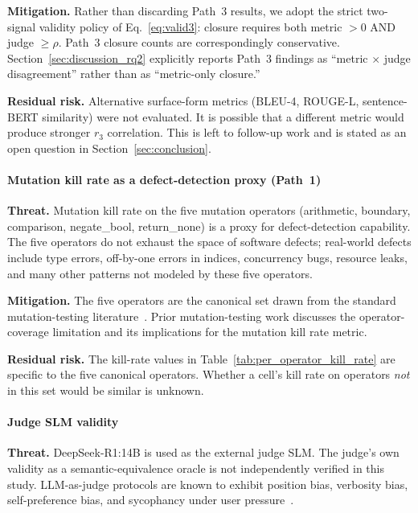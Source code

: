 \textbf{Mitigation.} Rather than discarding Path~3 results, we adopt the strict two-signal validity policy of Eq.~\ref{eq:valid3}: closure requires both metric $> 0$ AND judge $\geq \rho$. Path~3 closure counts are correspondingly conservative. Section~\ref{sec:discussion_rq2} explicitly reports Path~3 findings as ``metric $\times$ judge disagreement'' rather than as ``metric-only closure.''

\textbf{Residual risk.} Alternative surface-form metrics (BLEU-4, ROUGE-L, sentence-BERT similarity) were not evaluated. It is possible that a different metric would produce stronger $r_3$ correlation. This is left to follow-up work and is stated as an open question in Section~\ref{sec:conclusion}.

\paragraph{Mutation kill rate as a defect-detection proxy (Path~1)}

\textbf{Threat.} Mutation kill rate on the five mutation operators (arithmetic, boundary, comparison, negate\_bool, return\_none) is a proxy for defect-detection capability. The five operators do not exhaust the space of software defects; real-world defects include type errors, off-by-one errors in indices, concurrency bugs, resource leaks, and many other patterns not modeled by these five operators.

\textbf{Mitigation.} The five operators are the canonical set drawn from the standard mutation-testing literature~\citep{Andrews2005MutationAnalysis, Just2014MutationAnalysis}. Prior mutation-testing work discusses the operator-coverage limitation and its implications for the mutation kill rate metric.

\textbf{Residual risk.} The kill-rate values in Table~\ref{tab:per_operator_kill_rate} are specific to the five canonical operators. Whether a cell's kill rate on operators \emph{not} in this set would be similar is unknown.

\paragraph{Judge SLM validity}

\textbf{Threat.} DeepSeek-R1:14B is used as the external judge SLM. The judge's own validity as a semantic-equivalence oracle is not independently verified in this study. LLM-as-judge protocols are known to exhibit position bias, verbosity bias, self-preference bias, and sycophancy under user pressure~\citep{Panickssery2024JudgeBias, Wang2024JudgeBias, Fanous2025SycEval}.

